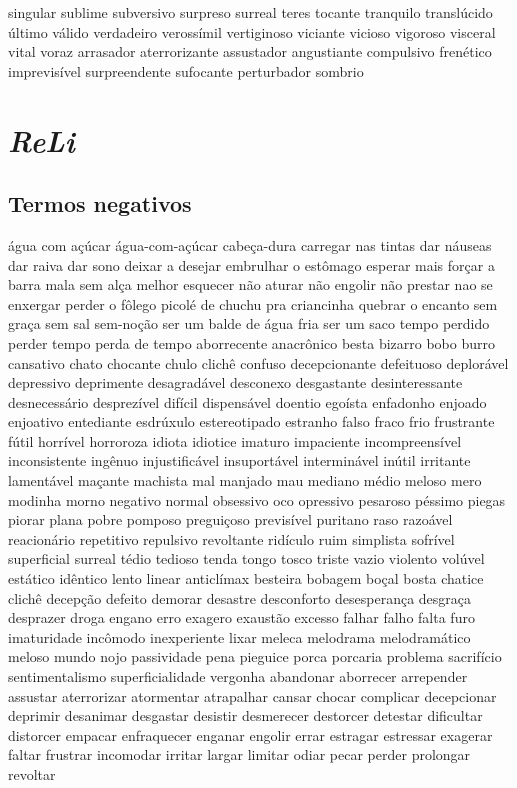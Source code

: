 \begin{appendices}
singular sublime subversivo surpreso surreal teres tocante tranquilo transl\'{u}cido \'{u}ltimo v\'{a}lido verdadeiro veross\'{i}mil vertiginoso viciante vicioso vigoroso visceral vital voraz arrasador aterrorizante assustador angustiante compulsivo fren\'{e}tico imprevis\'{i}vel surpreendente sufocante perturbador sombrio

\section{\textit{ReLi}}
\subsection{Termos negativos}
\'{a}gua com a\c{c}\'{u}car \'{a}gua-com-a\c{c}\'{u}car cabe\c{c}a-dura carregar nas tintas dar n\'{a}useas dar raiva dar sono deixar a desejar embrulhar o est\^{o}mago esperar mais for\c{c}ar a barra mala sem al\c{c}a melhor esquecer n\~ao aturar n\~ao engolir n\~ao prestar nao se enxergar perder o f\^{o}lego picol\'{e} de chuchu pra criancinha quebrar o encanto sem gra\c{c}a sem sal sem-no\c{c}\~ao ser um balde de \'{a}gua fria ser um saco tempo perdido perder tempo perda de tempo aborrecente anacr\^{o}nico besta bizarro bobo burro cansativo chato chocante chulo clich\^{e} confuso decepcionante defeituoso deplor\'{a}vel depressivo deprimente desagrad\'{a}vel desconexo desgastante desinteressante desnecess\'{a}rio desprez\'{i}vel dif\'{i}cil dispens\'{a}vel doentio ego\'{i}sta enfadonho enjoado enjoativo entediante esdr\'{u}xulo estereotipado estranho falso fraco frio frustrante f\'{u}til horr\'{i}vel horroroza idiota idiotice imaturo impaciente incompreens\'{i}vel inconsistente ing\^{e}nuo injustific\'{a}vel insuport\'{a}vel intermin\'{a}vel in\'{u}til irritante lament\'{a}vel ma\c{c}ante machista mal manjado mau mediano m\'{e}dio meloso mero modinha morno negativo normal obsessivo oco opressivo pesaroso p\'{e}ssimo piegas piorar plana pobre pomposo pregui\c{c}oso previs\'{i}vel puritano raso razo\'{a}vel reacion\'{a}rio repetitivo repulsivo revoltante rid\'{i}culo ruim simplista sofr\'{i}vel superficial surreal t\'{e}dio tedioso tenda tongo tosco triste vazio violento vol\'{u}vel est\'{a}tico id\^{e}ntico lento linear anticl\'{i}max besteira bobagem bo\c{c}al bosta chatice clich\^{e} decep\c{c}\~ao defeito demorar desastre desconforto desesperan\c{c}a desgra\c{c}a desprazer droga engano erro exagero exaust\~ao excesso falhar falho falta furo imaturidade inc\^{o}modo inexperiente lixar meleca melodrama melodram\'{a}tico meloso mundo nojo passividade pena pieguice porca porcaria problema sacrif\'{i}cio sentimentalismo superficialidade vergonha abandonar aborrecer arrepender assustar aterrorizar atormentar atrapalhar cansar chocar complicar decepcionar deprimir desanimar desgastar desistir desmerecer destorcer detestar dificultar distorcer empacar enfraquecer enganar engolir errar estragar estressar exagerar faltar frustrar incomodar irritar largar limitar odiar pecar perder prolongar revoltar



\end{appendices}
